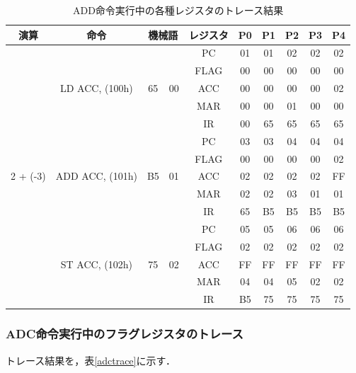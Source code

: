 \begin{table}[htb]
\caption{ADD命令実行中の各種レジスタのトレース結果}
\begin{center}
\begin{tabular}
{c|c|c|c|c|c|c|c|c|c}
\hline
演算 & 命令 & \multicolumn{2}{c|}{機械語} & レジスタ & P0 & P1 & P2 & P3 & P4  \\ \hline

\multirow{15}{*}{2 + (-3)}&
\multirow{5}{*}{LD ACC, (100h)}&
\multirow{5}{*}{65} & \multirow{5}{*}{00} 
		& PC	& 01 & 01 & 02 & 02 & 02 \\
& & &	& FLAG	& 00 & 00 & 00 & 00 & 00 \\
& & &	& ACC	& 00 & 00 & 00 & 00 & 02 \\
& & &	& MAR	& 00 & 00 & 01 & 00 & 00 \\
& & &	& IR	& 00 & 65 & 65 & 65 & 65 \\
\cline{2-10}

&
\multirow{5}{*}{ADD ACC, (101h)}&
\multirow{5}{*}{B5} & \multirow{5}{*}{01} 
		& PC	& 03 & 03 & 04 & 04 & 04 \\
& & &	& FLAG	& 00 & 00 & 00 & 00 & 02 \\
& & &	& ACC	& 02 & 02 & 02 & 02 & FF \\
& & &	& MAR	& 02 & 02 & 03 & 01 & 01 \\
& & &	& IR	& 65 & B5 & B5 & B5 & B5 \\
\cline{2-10}

&
\multirow{5}{*}{ST ACC, (102h)}&
\multirow{5}{*}{75} & \multirow{5}{*}{02} 
		& PC	& 05 & 05 & 06 & 06 & 06 \\
& & &	& FLAG	& 02 & 02 & 02 & 02 & 02 \\
& & &	& ACC	& FF & FF & FF & FF & FF \\
& & &	& MAR	& 04 & 04 & 05 & 02 & 02 \\
& & &	& IR	& B5 & 75 & 75 & 75 & 75 \\
\hline

\end{tabular}
\end{center}
\label{addtrace}
\end{table}

\clearpage
\subsubsection{ADC命令実行中のフラグレジスタのトレース}
トレース結果を，表\ref{adctrace}に示す．

